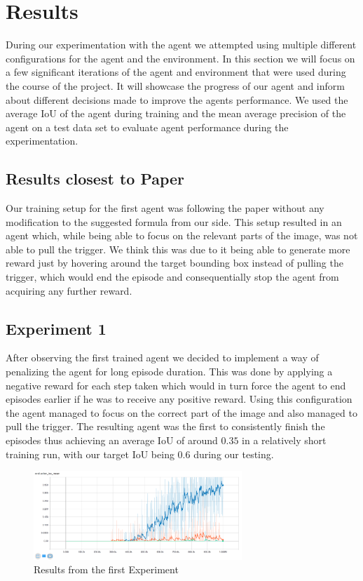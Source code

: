 \section{Results}\label{sec:Results}
During our experimentation with the agent we attempted using multiple different configurations for the agent and the environment.
In this section we will focus on a few significant iterations of the agent and environment that were used during the course of the project.
It will showcase the progress of our agent and inform about different decisions made to improve the agents performance.
We used the average IoU of the agent during training and the mean average precision of the agent on a test data set to evaluate agent performance during the experimentation.


\subsection{Results closest to Paper}
Our training setup for the first agent was following the paper\cite{caicedo2015active} without any modification to the suggested formula from our side.
This setup resulted in an agent which, while being able to focus on the relevant parts of the image, was not able to pull the trigger.
We think this was due to it being able to generate more reward just by hovering around the target bounding box instead of pulling the trigger, which would end the episode and consequentially stop the agent from acquiring any further reward.

\subsection{Experiment 1}
After observing the first trained agent we decided to implement a way of penalizing the agent for long episode duration.
This was done by applying a negative reward for each step taken which would in turn force the agent to end episodes earlier if he was to receive any positive reward.
Using this configuration the agent managed to focus on the correct part of the image and also managed to pull the trigger.
The resulting agent was the first to consistently finish the episodes thus achieving an average IoU of around $0.35$ in a relatively short training run, with our target IoU being $0.6$ during our testing.

\begin{figure}[h!]
    \centering
    \includegraphics[width=0.7\textwidth]{figures/penalty_results.png}
    \caption{Results from the first Experiment}
\end{figure}

